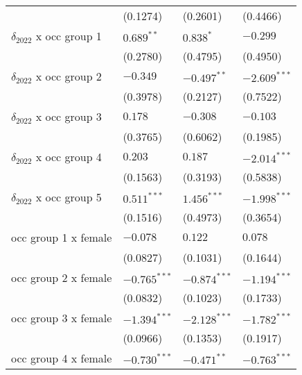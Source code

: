 \begin{tabular}{llll}
                                       &           (0.1274) &           (0.2601) &           (0.4466) \\
$\delta_{2022}$ x occ group 1          &       $0.689^{**}$ &          $0.838^*$ &           $-0.299$ \\
                                       &           (0.2780) &           (0.4795) &           (0.4950) \\
$\delta_{2022}$ x occ group 2          &           $-0.349$ &      $-0.497^{**}$ &     $-2.609^{***}$ \\
                                       &           (0.3978) &           (0.2127) &           (0.7522) \\
$\delta_{2022}$ x occ group 3          &            $0.178$ &           $-0.308$ &           $-0.103$ \\
                                       &           (0.3765) &           (0.6062) &           (0.1985) \\
$\delta_{2022}$ x occ group 4          &            $0.203$ &            $0.187$ &     $-2.014^{***}$ \\
                                       &           (0.1563) &           (0.3193) &           (0.5838) \\
$\delta_{2022}$ x occ group 5          &      $0.511^{***}$ &      $1.456^{***}$ &     $-1.998^{***}$ \\
                                       &           (0.1516) &           (0.4973) &           (0.3654) \\
occ group 1 x female                   &           $-0.078$ &            $0.122$ &            $0.078$ \\
                                       &           (0.0827) &           (0.1031) &           (0.1644) \\
occ group 2 x female                   &     $-0.765^{***}$ &     $-0.874^{***}$ &     $-1.194^{***}$ \\
                                       &           (0.0832) &           (0.1023) &           (0.1733) \\
occ group 3 x female                   &     $-1.394^{***}$ &     $-2.128^{***}$ &     $-1.782^{***}$ \\
                                       &           (0.0966) &           (0.1353) &           (0.1917) \\
occ group 4 x female                   &     $-0.730^{***}$ &      $-0.471^{**}$ &     $-0.763^{***}$ \\

\end{tabular}
